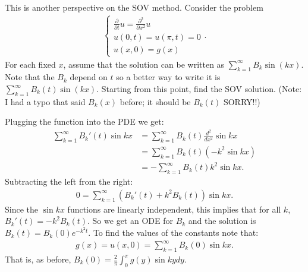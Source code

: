 \documentclass[12pt]{exam}
\newcommand{\pt}{\frac{\partial}{\partial t}}
\newcommand{\pxx}{\frac{\partial^2}{\partial x^2}}
\begin{document}
\begin{questions}
\newpage 
\begin{question}
This is another perspective on the SOV method. Consider the problem 
\begin{align*}
\begin{cases}
\pt u = \pxx u\\
u(0,t) = u(\pi, t) = 0\\ 
u(x,0) = g(x)
\end{cases}.
\end{align*}
For each fixed $x$, assume that the solution can be written as $\sum_{k=1}^{\infty}B_k\sin(kx)$. 
Note that the $B_k$ depend on $t$ so a better way to write it is $\sum_{k=1}^{\infty}
B_k(t) \sin(kx)$. Starting from this point, find the SOV solution. 
(Note: I had a typo that said $B_k(x)$ before; it should be 
$B_k(t)$ SORRY!!)
\end{question}
\begin{solutionorbox}[\stretch{1}]
Plugging the function into the PDE we get: 
\begin{align*}
\sum_{k=1}^{\infty}B_k'(t)\sin kx
&= \sum_{k=1}^{\infty}B_k(t)\frac{d^2}{dx^2}\sin kx
\\&= \sum_{k=1}^{\infty}B_k(t)(-k^2 \sin kx)
\\&= -\sum_{k=1}^{\infty}B_k(t)k^2 \sin kx.
\end{align*}
Subtracting the left from the right: 
\begin{align*}
0 = \sum_{k=1}^{\infty}(B_k'(t) + k^2 B_k(t))\sin kx.
\end{align*}
Since the $\sin kx$ functions are linearly independent, this implies that
for all $k$, $B_k'(t) =- k^2 B_k(t)$. So we get an ODE for $B_k$ and the 
solution is $B_k (t) = B_k(0)e^{-k^2 t}$. To find the values of the 
constants note that: 
\begin{align*}
g(x) 
= u(x,0)
= \sum_{k=1}^{\infty}B_k(0) \sin kx.
\end{align*}
That is, as before, $B_k(0) = \frac{2}{\pi}\int_{0}^{\pi}g(y)\sin ky dy$.
\end{solutionorbox}

\end{questions}
\end{document}
